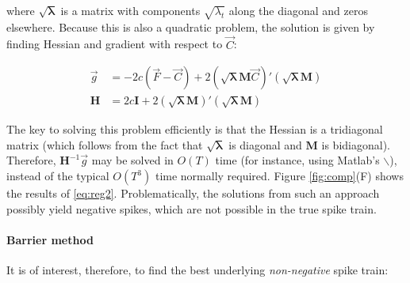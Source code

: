 \documentclass[12pt]{article}
\providecommand{\ve}[1]{\vec{#1}}
\providecommand{\ma}[1]{\boldsymbol{#1}}
\providecommand{\ve}[1]{\boldsymbol{#1}}
\newcommand{\Cav}{\ve{C}}%
\newcommand{\sml}{\sqrt{\ma{\lambda}}}
\begin{document}
\noindent where $\sml$ is a matrix with components $\sqrt{\lambda_t}$ along the diagonal and zeros elsewhere. Because this is also a quadratic problem, the solution is given by finding Hessian and gradient with respect to $\Cav$:

\begin{align}
\ve{g} &= -2c(\ve{F}-\Cav)+2 (\sml\ma{M}\Cav)'(\sml\ma{M})\\
\ma{H} &= 2c\ma{I}+2(\sml\ma{M})'(\sml\ma{M})
\end{align}

The key to solving this problem efficiently is that the Hessian is a tridiagonal matrix (which follows from the fact that $\sml$ is diagonal and $\ma{M}$ is bidiagonal).  Therefore, $\ma{H}^{-1}\ve{g}$ may be solved in $O(T)$ time (for instance, using Matlab's $\backslash$), instead of the typical $O(T^3)$ time normally required.  Figure \ref{fig:comp}(F) shows the results of \eqref{eq:reg2}.  Problematically, the solutions from such an approach possibly yield negative spikes, which are not possible in the true spike train.  

\paragraph{Barrier method}

It is of interest, therefore, to find the best underlying \emph{non-negative} spike train:


\end{document}
